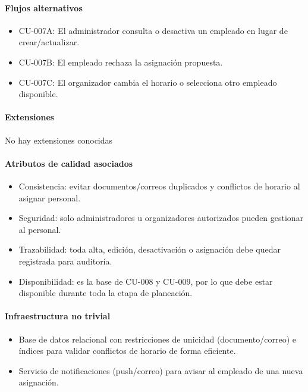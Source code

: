 \paragraph{Flujos alternativos}
\begin{itemize}[leftmargin=1.4em, topsep=1pt]
  \item CU-007A: El administrador consulta o desactiva un empleado en lugar de crear/actualizar.
  \item CU-007B: El empleado rechaza la asignación propuesta.
  \item CU-007C: El organizador cambia el horario o selecciona otro empleado disponible.
\end{itemize}

\paragraph{Extensiones}
No hay extensiones conocidas

\paragraph{Atributos de calidad asociados}
\begin{itemize}[leftmargin=1.4em, topsep=1pt]
  \item Consistencia: evitar documentos/correos duplicados y conflictos de horario al asignar personal.
  \item Seguridad: solo administradores u organizadores autorizados pueden gestionar al personal.
  \item Trazabilidad: toda alta, edición, desactivación o asignación debe quedar registrada para auditoría.
  \item Disponibilidad: es la base de CU-008 y CU-009, por lo que debe estar disponible durante toda la etapa de planeación.
\end{itemize}

\paragraph{Infraestructura no trivial}
\begin{itemize}[leftmargin=1.4em, topsep=1pt]
  \item Base de datos relacional con restricciones de unicidad (documento/correo) e índices para validar conflictos de horario de forma eficiente.
  \item Servicio de notificaciones (push/correo) para avisar al empleado de una nueva asignación.
\end{itemize}

